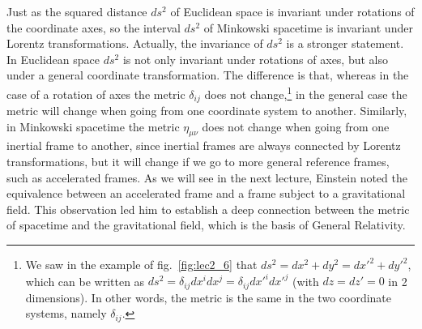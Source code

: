 Just as the squared distance $ds^2$ of Euclidean space is invariant under rotations of the coordinate axes, so the interval $ds^2$ of Minkowski spacetime is invariant under Lorentz transformations. Actually, the invariance of $ds^2$ is a stronger statement. In Euclidean space $ds^2$ is not only invariant under rotations of axes, but also under a general coordinate transformation. The difference is that, whereas in the case of a rotation of axes the metric $\delta_{ij}$ does not change,\footnote{We saw in the example of fig.\ \ref{fig:lec2_6} that $ds^2=dx^2+dy^2=dx'^2+dy'^2$, which can be written as $ds^2=\delta_{ij}dx^idx^j=\delta_{ij}dx'^idx'^j$ (with $dz=dz'=0$ in 2 dimensions). In other words, the metric is the same in the two coordinate systems, namely $\delta_{ij}$.} in the general case the metric will change when going from one coordinate system to another. Similarly, in Minkowski spacetime the metric $\eta_{\mu\nu}$ does not change when going from one inertial frame to another, since inertial frames 
are always connected by Lorentz transformations, but it will change if we go to more general reference frames, such as accelerated frames. As we will see in the next lecture, Einstein noted the equivalence between an accelerated frame and a frame subject to a gravitational field. This observation led him to establish a deep connection between the metric of spacetime and the gravitational field, which is the basis of General Relativity.
